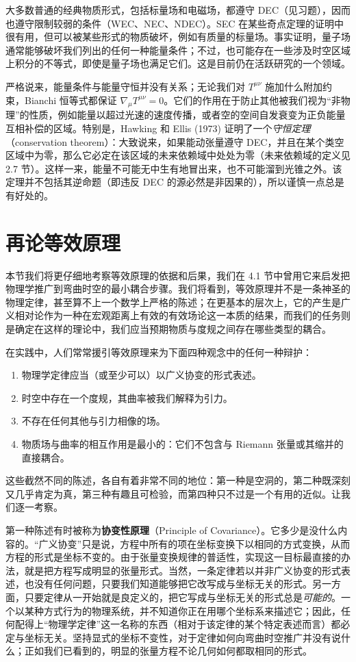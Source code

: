 大多数普通的经典物质形式，包括标量场和电磁场，都遵守 DEC（见习题），因而也遵守限制较弱的条件（WEC、NEC、NDEC）。SEC 在某些奇点定理的证明中很有用，但可以被某些形式的物质破坏，例如有质量的标量场。事实证明，量子场通常能够破坏我们列出的任何一种能量条件；不过，也可能存在一些涉及时空区域上积分的不等式，即使是量子场也满足它们。这是目前仍在活跃研究的一个领域。

严格说来，能量条件与能量守恒并没有关系；无论我们对 $T^{\mu\nu}$ 施加什么附加约束，Bianchi 恒等式都保证 $\nabla_\mu T^{\mu\nu} = 0$。它们的作用在于防止其他被我们视为“非物理”的性质，例如能量以超过光速的速度传播，或者空的空间自发衰变为正负能量互相补偿的区域。特别是，Hawking 和 Ellis (1973) 证明了一个\emph{守恒定理}（conservation theorem）：大致说来，如果能动张量遵守 DEC，并且在某个类空区域中为零，那么它必定在该区域的未来依赖域中处处为零（未来依赖域的定义见 2.7 节）。这样一来，能量不可能无中生有地冒出来，也不可能溜到光锥之外。该定理并不包括其逆命题（即违反 DEC 的源必然是非因果的），所以谨慎一点总是有好处的。

\section{再论等效原理}

本节我们将更仔细地考察等效原理的依据和后果，我们在 4.1 节中曾用它来启发把物理学推广到弯曲时空的最小耦合步骤。我们将看到，等效原理并不是一条神圣的物理定律，甚至算不上一个数学上严格的陈述；在更基本的层次上，它的产生是广义相对论作为一种在宏观距离上有效的有效场论这一本质的结果，而我们的任务则是确定在这样的理论中，我们应当预期物质与度规之间存在哪些类型的耦合。

在实践中，人们常常援引等效原理来为下面四种观念中的任何一种辩护：
\begin{enumerate}
\item 物理学定律应当（或至少可以）以广义协变的形式表述。
\item 时空中存在一个度规，其曲率被我们解释为引力。
\item 不存在任何其他与引力相像的场。
\item 物质场与曲率的相互作用是最小的：它们不包含与 Riemann 张量或其缩并的直接耦合。
\end{enumerate}

这些截然不同的陈述，各自有着非常不同的地位：第一种是空洞的，第二种既深刻又几乎肯定为真，第三种有趣且可检验，而第四种只不过是一个有用的近似。让我们逐一考察。

第一种陈述有时被称为\textbf{协变性原理}（Principle of Covariance）。它多少是没什么内容的。“广义协变”只是说，方程中所有的项在坐标变换下以相同的方式变换，从而方程的形式是坐标不变的。由于张量变换规律的普适性，实现这一目标最直接的办法，就是把方程写成明显的张量形式。当然，一条定律若以并非广义协变的形式表述，也没有任何问题，只要我们知道能够把它改写成与坐标无关的形式。另一方面，只要定律从一开始就是良定义的，把它写成与坐标无关的形式总是\emph{可能的}。一个以某种方式行为的物理系统，并不知道你正在用哪个坐标系来描述它；因此，任何配得上“物理学定律”这一名称的东西（相对于该定律的某个特定表述而言）都必定与坐标无关。坚持显式的坐标不变性，对于定律如何向弯曲时空推广并没有说什么；正如我们已看到的，明显的张量方程不论几何如何都取相同的形式。

